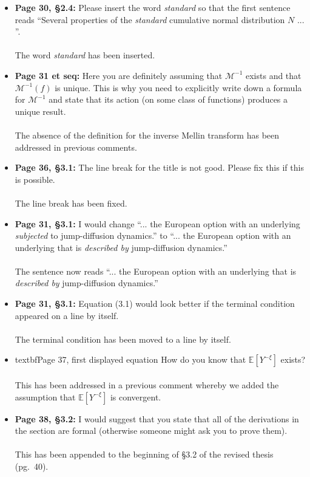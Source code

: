 \documentclass{article}
\begin{document}
\begin{enumerate}
\begin{itemize}
			\item{\textbf{Page 30, \S 2.4:} Please insert the word \emph{standard} so that the first sentence reads ``Several properties of the \emph{standard} cumulative normal distribution $N$ ... ''.
			\\\\}
			The word \emph{standard} has been inserted.
			
						
			\item{\textbf{Page 31 et seq: } Here you are definitely assuming that $\mathscr{M}^{-1}$ exists and that $\mathscr{M}^{-1}(f)$ is unique. This is why you need to explicitly write down a formula for $\mathscr{M}^{-1}$ and state that its action (on some class of functions) produces a unique result.
			\\\\}
			The absence of the definition for the inverse Mellin transform has been addressed in previous comments.
			
			\item{\textbf{Page 36, \S3.1: } The line break for the title is not good. Please fix this if this is possible.
			\\\\}
			The line break has been fixed.
			
			\item{\textbf{Page 31, \S3.1: } I would change ``... the European option with an underlying \emph{subjected} to jump-diffusion dynamics.'' to ``... the European option with an underlying that is \emph{described by} jump-diffusion dynamics.''
			\\\\}
			The sentence now reads ``... the European option with an underlying that is \emph{described by} jump-diffusion dynamics.''
			\item{\textbf{Page 31, \S3.1: } Equation (3.1) would look better if the terminal condition appeared on a line by itself. \\\\}
			The terminal condition has been moved to a line by itself.
			
			\item{textbf{Page 37, first displayed equation} How do you know that $\mathbb{E}[Y^{-\xi}]$ exists?
			\\\\}
			This has been addressed in a previous comment whereby we added the assumption that $\mathbb{E}[Y^{-\xi}]$ is convergent.
			
			\item{\textbf{Page 38, \S3.2: } I would suggest that you state that all of the derivations in the section are formal (otherwise someone might ask you to prove them).
			\\\\}
			This has been appended to the beginning of \S3.2 of the revised thesis (pg.~40).
			

\end{itemize}
\end{enumerate}
\end{document}
